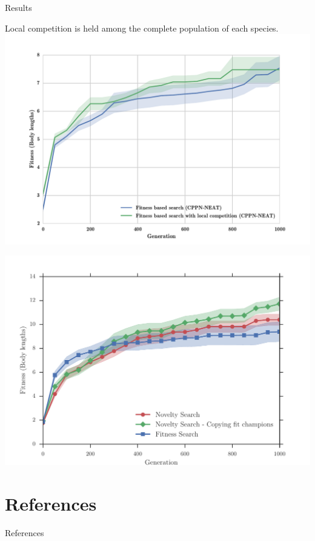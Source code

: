 \documentclass{beamer}
\begin{document}
\begin{frame}[allowframebreaks]{Results}
\begin{minipage}{\textwidth}
\begin{block}{Local competition is held among the complete population of each species.}
\includegraphics[width=1.0\textwidth]{../Figures/Results/fitComp100percent.pdf}
\end{block}
\end{minipage}


\begin{minipage}{\textwidth}
\begin{block}{}
\includegraphics[width=1.0\textwidth]{../Figures/Results/CopyFitChampions10.pdf}
\end{block}
\end{minipage}
\end{frame}

\section{References}

\begin{frame}[allowframebreaks]{References}


\end{frame}
\end{document}
